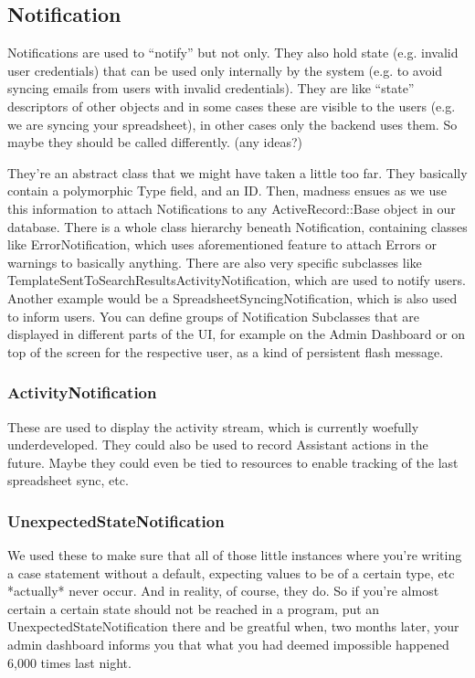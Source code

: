 \subsection{Notification}

Notifications are used to “notify” but not only. They also hold state (e.g. invalid user credentials) that can be used only internally by the system (e.g. to avoid syncing emails from users with invalid credentials). They are like “state” descriptors of other objects and in some cases these are visible to the users (e.g. we are syncing your spreadsheet), in other cases only the backend uses them. So maybe they should be called differently. (any ideas?)

They’re an abstract class that we might have taken a little too far. They basically contain a polymorphic Type field, and an ID. Then, madness ensues as we use this information to attach Notifications to any ActiveRecord::Base object in our database. There is a whole class hierarchy beneath Notification, containing classes like ErrorNotification, which uses aforementioned feature to attach Errors or warnings to basically anything. There are also very specific subclasses like TemplateSentToSearchResultsActivityNotification, which are used to notify users. Another example would be a SpreadsheetSyncingNotification, which is also used to inform users. You can define groups of Notification Subclasses that are displayed in different parts of the UI, for example on the Admin Dashboard or on top of the screen for the respective user, as a kind of persistent flash message.

\subsubsection{ActivityNotification}

These are used to display the activity stream, which is currently woefully underdeveloped.
They could also be used to record Assistant actions in the future. Maybe they could even be tied to resources to enable tracking of the last spreadsheet sync, etc.

\subsubsection{UnexpectedStateNotification}

We used these to make sure that all of those little instances where you’re writing a case statement without a default, expecting values to be of a certain type, etc *actually* never occur. And in reality, of course, they do. So if you’re almost certain a certain state should not be reached in a program, put an UnexpectedStateNotification there and be greatful when, two months later, your admin dashboard informs you that what you had deemed impossible happened 6,000 times last night.

